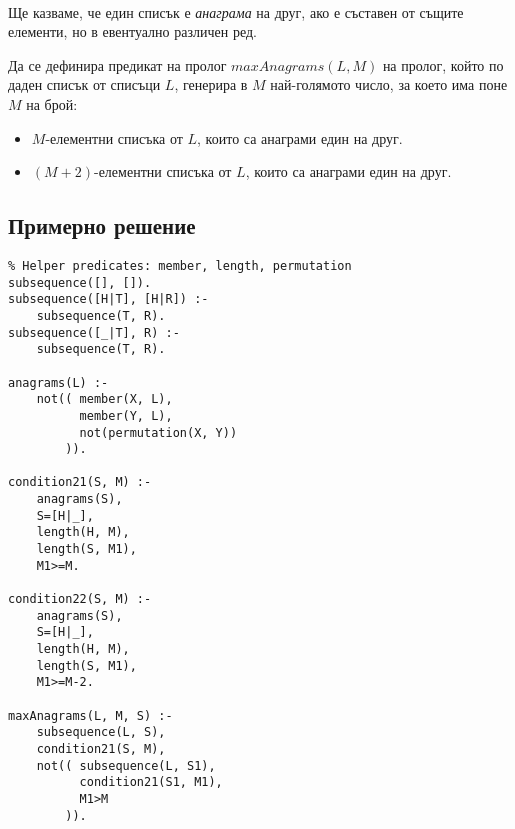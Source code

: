 \documentclass[12pt]{article}
\newenvironment{longlisting}{\captionsetup{type=listing}}{}
\begin{document}
\paragraph{} 
Ще казваме, че един списък е \emph{анаграма} на друг, ако е съставен от същите елементи, но в евентуално различен ред.

Да се дефинира предикат на пролог $maxAnagrams(L,M)$ на пролог, който по даден списък от списъци $L$, генерира в $M$ най-голямото число,
за което има поне $M$ на брой: 
\begin{itemize}
    \item $M$-елементни списъка от $L$, които са анаграми един на друг.
    \item $(M+2)$-елементни списъка от $L$, които са анаграми един на друг.
\end{itemize}

\subsection{Примерно решение} 
\begin{longlisting}
\begin{verbatim}
% Helper predicates: member, length, permutation
subsequence([], []).
subsequence([H|T], [H|R]) :-
    subsequence(T, R).
subsequence([_|T], R) :-
    subsequence(T, R).

anagrams(L) :-
    not(( member(X, L),
          member(Y, L),
          not(permutation(X, Y))
        )).

condition21(S, M) :-
    anagrams(S),
    S=[H|_],
    length(H, M),
    length(S, M1),
    M1>=M.

condition22(S, M) :-
    anagrams(S),
    S=[H|_],
    length(H, M),
    length(S, M1),
    M1>=M-2.

maxAnagrams(L, M, S) :-
    subsequence(L, S),
    condition21(S, M),
    not(( subsequence(L, S1),
          condition21(S1, M1),
          M1>M
        )).
\end{verbatim}
\end{longlisting}
\end{document}
